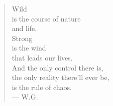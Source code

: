 \begin{verse}
Wild \\
is the course of nature \\
and life. \\
Strong \\
is the wind \\
that leads our lives. \\
And the only control there is, \\
the only reality there'll ever be, \\
is the rule of chaos. \\
--- W.G.
\end{verse}

